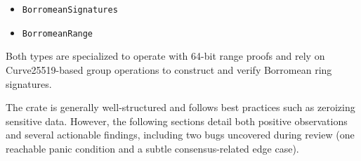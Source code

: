 \documentclass[12pt,a4paper]{article}
\begin{document}
\begin{itemize}
  \item \texttt{BorromeanSignatures} %
  \item \texttt{BorromeanRange} %
\end{itemize}

Both types are specialized to operate with 64-bit range proofs and rely on Curve25519-based group operations to construct and verify Borromean ring signatures.

The crate is generally well-structured and follows best practices such as zeroizing sensitive data. However, the following sections detail both positive observations and several actionable findings, including two bugs uncovered during review (one reachable panic condition and a subtle consensus-related edge case).
\end{document}
